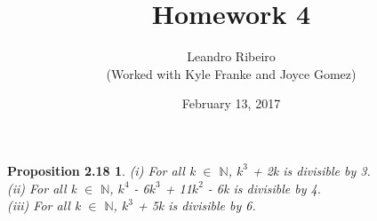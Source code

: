 \documentclass[12pt]{amsart}
\newcommand{\N}{\mathbb{N}}
\begin{document}
\title{Homework 4}
\date{February 13, 2017}
\author{Leandro Ribeiro\\(Worked with Kyle Franke and Joyce Gomez)}

\maketitle

\newtheorem*{prop2.18}{Proposition 2.18}
\begin{prop2.18}
	(i) For all k $\in$ $\N$, $k^3$ + 2k is divisible by 3.
	\\\indent(ii) For all k $\in$ $\N$, $k^4$ - 6$k^3$ + 11$k^2$ - 6k is divisible by 4.
	\\\indent(iii) For all k $\in$ $\N$, $k^3$ + 5k is divisible by 6.
\end{prop2.18}
\end{document}
